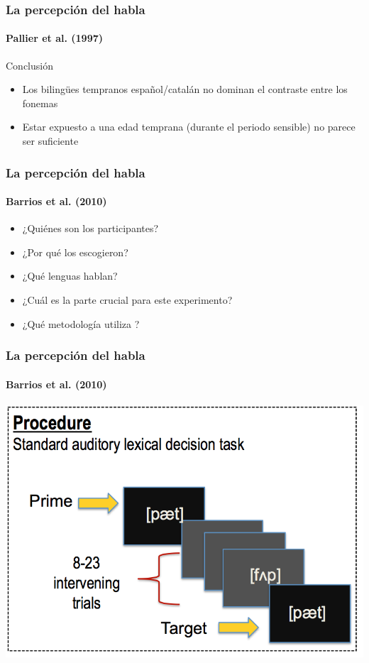 \documentclass{beamer}
\begin{document}
\begin{frame} 
	\frametitle{La percepción del habla}
	\framesubtitle{Pallier et al. (1997)}
	
	Conclusión
	\begin{itemize}
		\item Los bilingües tempranos español/catalán no dominan el contraste entre los fonemas 
		\item Estar expuesto a una edad temprana (durante el periodo sensible) no parece ser suficiente
	\end{itemize}
\end{frame}




\begin{frame}
	\frametitle{La percepción del habla}
	\framesubtitle{Barrios et al. (2010)}
	
	\begin{itemize}
		\item ¿Quiénes son los participantes? 
		\item ¿Por qué los escogieron? 
		\item ¿Qué lenguas hablan? 
		\item ¿Cuál es la parte crucial para este experimento?
		\item ¿Qué metodología utiliza \cite{Barrios2010}?
	\end{itemize}
\end{frame}

\begin{frame}
	\frametitle{La percepción del habla}
	\framesubtitle{Barrios et al. (2010)}
	
	\begin{center}
		\includegraphics[scale=.25]{figures/barrios1.png}
	\end{center}
\end{frame}
\end{document}
